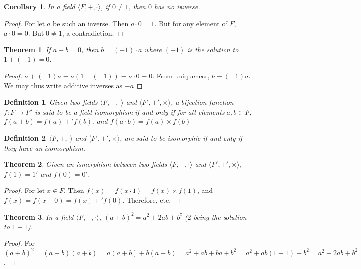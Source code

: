 \documentclass[crop=false,class=book]{standalone}
\theoremstyle{mystyle}
\newtheorem{theorem}{Theorem}[section]
\newtheorem{definition}{Definition}[section]
\newtheorem{corollary}{Corollary}[section]
\begin{document}
\begin{corollary}
In a field $\langle F, +,\cdot \rangle$, if $0\ne 1$, then $0$ has no inverse.
\end{corollary}
\begin{proof}
For let $a$ be such an inverse. Then $a\cdot 0 = 1$. But for any element of $F$, $a \cdot 0 = 0$. But $0\ne 1$, a contradiction.
\end{proof}
\begin{theorem}
If $a+b = 0$, then $b= (-1)\cdot a$ where $(-1)$ is the solution to $1+(-1)=0$.
\end{theorem}
\begin{proof}
$a+(-1)a = a(1+(-1)) = a\cdot 0 = 0$. From uniqueness, $b=(-1)a$. We may thus write additive inverses as $-a$
\end{proof}
\begin{definition}
Given two fields $\langle F,+,\cdot \rangle$ and $\langle F', +',\times \rangle$, a bijection function $f:F\rightarrow F'$ is said to be a field isomorphism if and only if for all elements $a,b\in F$, $f(a+b)=f(a)+'f(b)$, and $f(a\cdot b) = f(a)\times f(b)$
\end{definition}
\begin{definition}
$\langle F,+,\cdot \rangle$ and $\langle F', +',\times \rangle$, are said to be isomorphic if and only if they have an isomorphism.
\end{definition}
\begin{theorem}
Given an ismorphism between two fields $\langle F,+,\cdot \rangle$ and $\langle F', +',\times \rangle$, $f(1) = 1'$ and $f(0) = 0'$.
\end{theorem}
\begin{proof}
For let $x\in F$. Then $f(x)=f(x\cdot 1) = f(x)\times f(1)$, and $f(x)=f(x+0) = f(x)+'f(0)$. Therefore, etc.
\end{proof}
\begin{theorem}
In a field $\langle F,+,\cdot \rangle$, $(a+ b)^2 = a^2 + 2ab + b^2$ ($2$ being the solution to $1+1$).
\end{theorem}
\begin{proof}
For $(a+b)^2 = (a+b)(a+b) = a(a+b)+b(a+b) = a^2 + ab + ba + b^2 = a^2 +ab(1+1)+b^2 = a^2 + 2ab + b^2$.
\end{proof}
\end{document}
